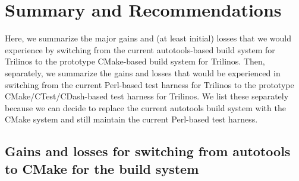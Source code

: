 \documentclass[pdf,ps2pdf,11pt]{SANDreport}
\begin{document}
%
\section{Summary and Recommendations}
%

Here, we summarize the major gains and (at least initial) losses that
we would experience by switching from the current autotools-based
build system for Trilinos to the prototype CMake-based build system for
Trilinos.  Then, separately, we summarize the gains and losses that
would be experienced in switching from the current Perl-based test
harness for Trilinos to the prototype CMake/CTest/CDash-based test
harness for Trilinos.  We list these separately because we can decide
to replace the current autotools build system with the CMake system
and still maintain the current Perl-based test harness.


%
\subsection{Gains and losses for switching from autotools to CMake for the build system}
%
\end{document}

